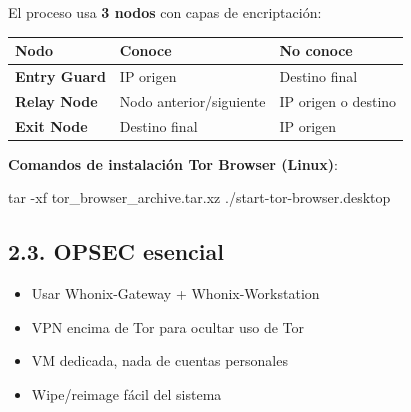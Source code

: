 \documentclass[
  letterpaper,
]{report}
\newenvironment{Shaded}{\begin{snugshade}}{\end{snugshade}}
\newcommand{\AttributeTok}[1]{\textcolor[rgb]{0.40,0.45,0.13}{#1}}
\newcommand{\ExtensionTok}[1]{\textcolor[rgb]{0.00,0.23,0.31}{#1}}
\newcommand{\FunctionTok}[1]{\textcolor[rgb]{0.28,0.35,0.67}{#1}}
\newcommand{\NormalTok}[1]{\textcolor[rgb]{0.00,0.23,0.31}{#1}}
\newcounter{none} %
\providecommand{\tightlist}{%
  \setlength{\itemsep}{0pt}\setlength{\parskip}{0pt}}
\begin{document}
El proceso usa \textbf{3 nodos} con capas de encriptación:

\begin{tcolorbox}[enhanced jigsaw, arc=.35mm, bottomrule=.15mm, bottomtitle=1mm, breakable, colback=white, colbacktitle=quarto-callout-tip-color!10!white, colframe=quarto-callout-tip-color-frame, coltitle=black, left=2mm, leftrule=.75mm, opacityback=0, opacitybacktitle=0.6, rightrule=.15mm, title=\textcolor{quarto-callout-tip-color}{\faLightbulb}\hspace{0.5em}{Tres nodos de Tor}, titlerule=0mm, toprule=.15mm, toptitle=1mm]

{\def\LTcaptype{none} %
\begin{longtable}[]{@{}lll@{}}
\toprule\noalign{}
Nodo & Conoce & No conoce \\
\midrule\noalign{}
\endhead
\bottomrule\noalign{}
\endlastfoot
\textbf{Entry Guard} & IP origen & Destino final \\
\textbf{Relay Node} & Nodo anterior/siguiente & IP origen o destino \\
\textbf{Exit Node} & Destino final & IP origen \\
\end{longtable}
}

\end{tcolorbox}

\textbf{Comandos de instalación Tor Browser (Linux)}:

\begin{Shaded}
\begin{Highlighting}[]
\FunctionTok{tar} \AttributeTok{{-}xf}\NormalTok{ tor\_browser\_archive.tar.xz}
\ExtensionTok{./start{-}tor{-}browser.desktop}
\end{Highlighting}
\end{Shaded}

\subsection{2.3. OPSEC esencial}\label{opsec-esencial}

\begin{itemize}
\tightlist
\item
  Usar Whonix-Gateway + Whonix-Workstation
\item
  VPN encima de Tor para ocultar uso de Tor
\item
  VM dedicada, nada de cuentas personales
\item
  Wipe/reimage fácil del sistema
\end{itemize}
\end{document}
